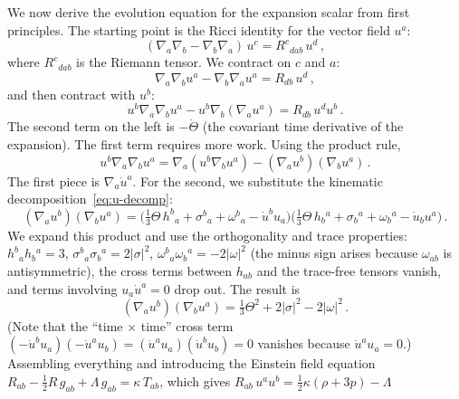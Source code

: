 We now derive the evolution equation for the expansion scalar
from first principles.  The starting point is the Ricci identity
for the vector field $u^a$:
\begin{equation}\label{eq:ricci-identity}
(\nabla_a \nabla_b - \nabla_b \nabla_a)\,u^c
= R^c{}_{dab}\,u^d\,,
\end{equation}
where $R^c{}_{dab}$ is the Riemann tensor.  We contract on $c$
and $a$:
\begin{equation}\label{eq:ricci-contract1}
\nabla_a \nabla_b u^a - \nabla_b \nabla_a u^a
= R_{db}\,u^d\,,
\end{equation}
and then contract with $u^b$:
\begin{equation}\label{eq:raych-step1}
u^b \nabla_a \nabla_b u^a
- u^b \nabla_b (\nabla_a u^a)
= R_{db}\,u^d u^b\,.
\end{equation}
The second term on the left is $-\dot{\Theta}$ (the covariant
time derivative of the expansion).  The first term requires more
work.  Using the product rule,
\begin{equation}
u^b \nabla_a \nabla_b u^a
= \nabla_a(u^b \nabla_b u^a) - (\nabla_a u^b)(\nabla_b u^a)\,.
\end{equation}
The first piece is $\nabla_a \dot{u}^a$.  For the second, we
substitute the kinematic decomposition~\eqref{eq:u-decomp}:
\begin{equation}
(\nabla_a u^b)(\nabla_b u^a)
= \bigl(\tfrac{1}{3}\Theta\,h^b{}_a + \sigma^b{}_a
  + \omega^b{}_a - \dot{u}^b u_a\bigr)
  \bigl(\tfrac{1}{3}\Theta\,h_{b}{}^{a} + \sigma_{b}{}^{a}
  + \omega_{b}{}^{a} - \dot{u}_b u^a\bigr)\,.
\end{equation}
We expand this product and use the orthogonality and trace
properties: $h^b{}_a h_b{}^a = 3$,
$\sigma^b{}_a \sigma_b{}^a = 2|\sigma|^2$,
$\omega^b{}_a \omega_b{}^a = -2|\omega|^2$ (the minus sign arises
because $\omega_{ab}$ is antisymmetric), the cross terms between
$h_{ab}$ and the trace-free tensors vanish, and terms involving
$u_a \dot{u}^a = 0$ drop out.  The result is
\begin{equation}
(\nabla_a u^b)(\nabla_b u^a)
= \tfrac{1}{3}\Theta^2 + 2|\sigma|^2 - 2|\omega|^2\,.
\end{equation}
(Note that the ``time $\times$ time'' cross term
$(-\dot{u}^b u_a)(-\dot{u}^a u_b)
= (\dot{u}^a u_a)(\dot{u}^b u_b) = 0$
vanishes because $\dot{u}^a u_a = 0$.)
Assembling everything and introducing the Einstein field
equation $R_{ab} - \frac{1}{2}R\,g_{ab} + \Lambda\,g_{ab}
= \kappa\,T_{ab}$, which gives
$R_{ab}\,u^a u^b = \frac{1}{2}\kappa(\rho + 3p) - \Lambda$
